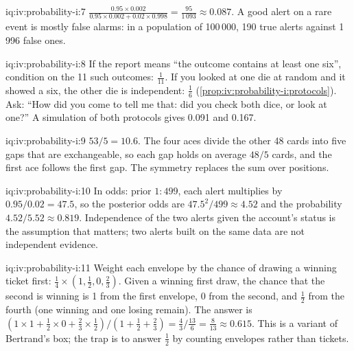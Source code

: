 \begin{solution}{iq:iv:probability-i:7}
$\frac{0.95 \times 0.002}{0.95 \times 0.002 + 0.02 \times 0.998} = \frac{95}{1\,093} \approx 0.087$. A good alert on a
rare event is mostly false alarms: in a population of 100\,000, 190 true alerts against 1\,996 false ones.
\end{solution}

\begin{solution}{iq:iv:probability-i:8}
If the report means ``the outcome contains at least one six'', condition on the 11 such outcomes: $\tfrac1{11}$.
If you looked at one die at random and it showed a six, the other die is independent: $\tfrac16$
(\cref{prop:iv:probability-i:protocols}). Ask: ``How did you come to tell me that: did you check both dice, or
look at one?'' A simulation of both protocols gives 0.091 and 0.167.
\end{solution}

\begin{solution}{iq:iv:probability-i:9}
$53/5 = 10.6$. The four aces divide the other 48 cards into five gaps that are exchangeable, so each gap holds on
average $48/5$ cards, and the first ace follows the first gap. The symmetry replaces the sum over positions.
\end{solution}

\begin{solution}{iq:iv:probability-i:10}
In odds: prior $1:499$, each alert multiplies by $0.95/0.02 = 47.5$, so the posterior odds are $47.5^2/499 \approx
4.52$ and the probability $4.52/5.52 \approx 0.819$. Independence of the two alerts given the account's status is
the assumption that matters; two alerts built on the same data are not independent evidence.
\end{solution}

\begin{solution}{iq:iv:probability-i:11}
Weight each envelope by the chance of drawing a winning ticket first: $\tfrac14 \times (1, \tfrac12, 0,
\tfrac23)$. Given a winning first draw, the chance that the second is winning is 1 from the first envelope, 0 from
the second, and $\tfrac12$ from the fourth (one winning and one losing remain). The answer is $(1 \times 1 +
\tfrac12 \times 0 + \tfrac23 \times \tfrac12)/(1 + \tfrac12 + \tfrac23) = \tfrac43 / \tfrac{13}6 = \tfrac8{13} \approx
0.615$. This is a variant of Bertrand's box; the trap is to answer $\tfrac12$ by counting envelopes rather than
tickets.
\end{solution}

